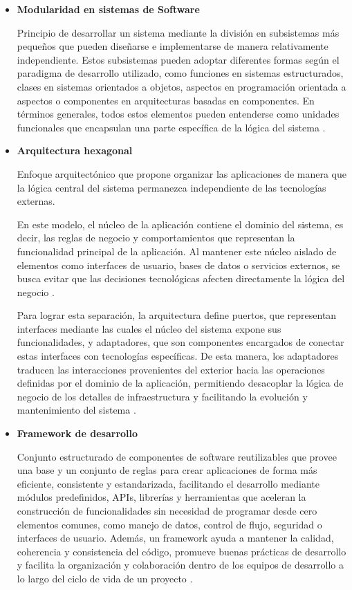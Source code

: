 \begin{itemize}
    \item \textbf{Modularidad en sistemas de Software}  
    
    Principio de desarrollar un sistema mediante la división en subsistemas más pequeños que pueden diseñarse e implementarse de manera relativamente independiente. Estos subsistemas pueden adoptar diferentes formas según el paradigma de desarrollo utilizado, como funciones en sistemas estructurados, clases en sistemas orientados a objetos, aspectos en programación orientada a aspectos o componentes en arquitecturas basadas en componentes. En términos generales, todos estos elementos pueden entenderse como unidades funcionales que encapsulan una parte específica de la lógica del sistema \citep{Yu2009}.

    \item \textbf{Arquitectura hexagonal}  
    
    Enfoque arquitectónico que propone organizar las aplicaciones de manera que la lógica central del sistema permanezca independiente de las tecnologías externas. 
    
    En este modelo, el núcleo de la aplicación contiene el dominio del sistema, es decir, las reglas de negocio y comportamientos que representan la funcionalidad principal de la aplicación. Al mantener este núcleo aislado de elementos como interfaces de usuario, bases de datos o servicios externos, se busca evitar que las decisiones tecnológicas afecten directamente la lógica del negocio \citep{AlistairCockburn2005}. 
    
    Para lograr esta separación, la arquitectura define puertos, que representan interfaces mediante las cuales el núcleo del sistema expone sus funcionalidades, y adaptadores, que son componentes encargados de conectar estas interfaces con tecnologías específicas. De esta manera, los adaptadores traducen las interacciones provenientes del exterior hacia las operaciones definidas por el dominio de la aplicación, permitiendo desacoplar la lógica de negocio de los detalles de infraestructura y facilitando la evolución y mantenimiento del sistema \citep{AlistairCockburn2005}.

    \item \textbf{Framework de desarrollo}  
    
    Conjunto estructurado de componentes de software reutilizables que provee una base y un conjunto de reglas para crear aplicaciones de forma más eficiente, consistente y estandarizada, facilitando el desarrollo mediante módulos predefinidos, APIs, librerías y herramientas que aceleran la construcción de funcionalidades sin necesidad de programar desde cero elementos comunes, como manejo de datos, control de flujo, seguridad o interfaces de usuario. Además, un framework ayuda a mantener la calidad, coherencia y consistencia del código, promueve buenas prácticas de desarrollo y facilita la organización y colaboración dentro de los equipos de desarrollo a lo largo del ciclo de vida de un proyecto \citep{aws-framework-2026}.


\end{itemize}
